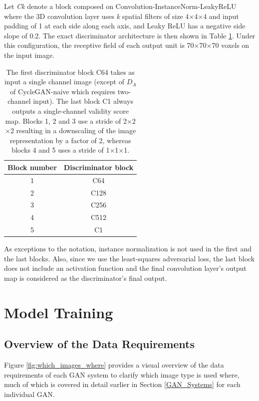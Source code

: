 Let \textit{Ck} denote a block composed on Convolution-InstanceNorm-LeakyReLU where the 3D convolution layer uses \textit{k} spatial filters of size 4$\times$4$\times$4 and input padding of 1 at each side along each axis, and Leaky ReLU has a negative side slope of 0.2. The exact discriminator architecture is then shown in Table \ref{tab:discriminator_architecture}. Under this configuration, the receptive field of each output unit is 70$\times$70$\times$70 voxels on the input image.

\begin{table}[h!]
    \centering
    \begin{tabular}{|c|c|}
        \hline
        \textbf{Block number} & \textbf{Discriminator block}\\
        \hline
        1     & C64       \\
        \hline
        2     & C128      \\
        \hline
        3     & C256      \\
        \hline 
        4     & C512      \\
        \hline
        5     & C1        \\
        \hline
    \end{tabular}
    \caption{The first discriminator block C64 takes as input a single channel image (except of $D_A$ of CycleGAN-naive which requires two-channel input). The last block C1 always outputs a single-channel validity score map. Blocks 1, 2 and 3 use a stride of 2$\times$2$\times$2 resulting in a downscaling of the image representation by a factor of 2, whereas blocks 4 and 5 uses a stride of 1$\times$1$\times$1.}
    \label{tab:discriminator_architecture}
\end{table}
As exceptions to the notation, instance normalization is not used in the first and the last blocks. Also, since we use the least-squares adversarial loss, the last block does not include an activation function and the final convolution layer's output map is considered as the discriminator's final output.



\section{Model Training}


\subsection{Overview of the Data Requirements}
\label{data_requirements}
Figure \ref{fig:which_images_where} provides a visual overview of the data requirements of each GAN system to clarify which image type is used where, much of which is covered in detail earlier in Section \ref{GAN_Systems} for each individual GAN.

